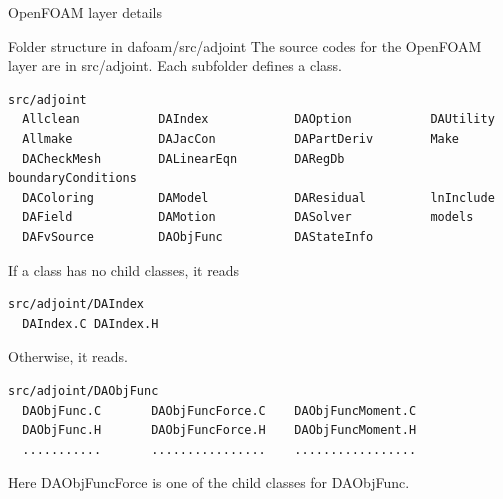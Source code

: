 \documentclass{bredelebeamer}
\begin{document}
\begin{frame}{}
  \center \Large OpenFOAM layer details
\end{frame}

\begin{frame}[fragile]{Folder structure in dafoam/src/adjoint}
The source codes for the OpenFOAM layer are in src/adjoint. Each subfolder defines a class.
\footnotesize
\lstset{ language=bash }
\begin{lstlisting}
src/adjoint
  Allclean           DAIndex            DAOption           DAUtility
  Allmake            DAJacCon           DAPartDeriv        Make
  DACheckMesh        DALinearEqn        DARegDb            boundaryConditions
  DAColoring         DAModel            DAResidual         lnInclude
  DAField            DAMotion           DASolver           models
  DAFvSource         DAObjFunc          DAStateInfo
\end{lstlisting}
\normalsize

If a class has no child classes, it reads
\footnotesize
\lstset{ language=bash }
\begin{lstlisting}
src/adjoint/DAIndex
  DAIndex.C DAIndex.H
\end{lstlisting}
\normalsize

Otherwise, it reads.
\footnotesize
\lstset{ language=bash }
\begin{lstlisting}
src/adjoint/DAObjFunc
  DAObjFunc.C       DAObjFuncForce.C    DAObjFuncMoment.C
  DAObjFunc.H       DAObjFuncForce.H    DAObjFuncMoment.H
  ...........       ................    .................
\end{lstlisting}
\normalsize

Here DAObjFuncForce is one of the child classes for DAObjFunc.

\end{frame}
\end{document}
